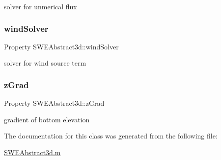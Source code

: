 solver for unmerical flux 

\mbox{\label{class_s_w_e_abstract3d_a53c1f46f7b01c1dbad920b83dd9ed36d}} 
\subsubsection{\texorpdfstring{wind\+Solver}{windSolver}}
{\footnotesize\ttfamily Property S\+W\+E\+Abstract3d\+::wind\+Solver\hspace{0.3cm}{\ttfamily [private]}}



solver for wind source term 

\mbox{\label{class_s_w_e_abstract3d_aab40d4b93b0543f975a46276ef3ea756}} 
\subsubsection{\texorpdfstring{z\+Grad}{zGrad}}
{\footnotesize\ttfamily Property S\+W\+E\+Abstract3d\+::z\+Grad\hspace{0.3cm}{\ttfamily [protected]}}



gradient of bottom elevation 



The documentation for this class was generated from the following file\+:\begin{DoxyCompactItemize}
\item 
\hyperlink{_s_w_e_abstract3d_8m}{S\+W\+E\+Abstract3d.\+m}\end{DoxyCompactItemize}
